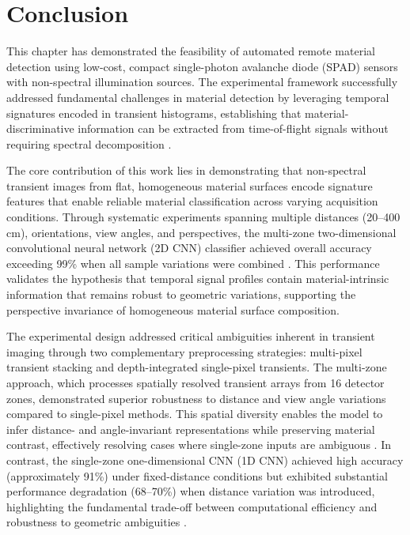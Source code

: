 \documentclass[12pt,a4paper,oneside]{report}
\let\oldsection\section
\renewcommand{\section}{\clearpage\oldsection}
\begin{document}
\section{Conclusion}
\label{sec:conclusion_chapter4}

This chapter has demonstrated the feasibility of automated remote material detection using low-cost, compact single-photon avalanche diode (SPAD) sensors with non-spectral illumination sources. The experimental framework successfully addressed fundamental challenges in material detection by leveraging temporal signatures encoded in transient histograms, establishing that material-discriminative information can be extracted from time-of-flight signals without requiring spectral decomposition \cite{su2016,becker2023}.

The core contribution of this work lies in demonstrating that non-spectral transient images from flat, homogeneous material surfaces encode signature features that enable reliable material classification across varying acquisition conditions. Through systematic experiments spanning multiple distances (20--400\,cm), orientations, view angles, and perspectives, the multi-zone two-dimensional convolutional neural network (2D CNN) classifier achieved overall accuracy exceeding 99\% when all sample variations were combined \cite{su2016,becker2023}. This performance validates the hypothesis that temporal signal profiles contain material-intrinsic information that remains robust to geometric variations, supporting the perspective invariance of homogeneous material surface composition.

The experimental design addressed critical ambiguities inherent in transient imaging through two complementary preprocessing strategies: multi-pixel transient stacking and depth-integrated single-pixel transients. The multi-zone approach, which processes spatially resolved transient arrays from 16 detector zones, demonstrated superior robustness to distance and view angle variations compared to single-pixel methods. This spatial diversity enables the model to infer distance- and angle-invariant representations while preserving material contrast, effectively resolving cases where single-zone inputs are ambiguous \cite{jungerman2022,koerner2021}. In contrast, the single-zone one-dimensional CNN (1D CNN) achieved high accuracy (approximately 91\%) under fixed-distance conditions but exhibited substantial performance degradation (68--70\%) when distance variation was introduced, highlighting the fundamental trade-off between computational efficiency and robustness to geometric ambiguities \cite{su2016,tafone2023}.
\end{document}
